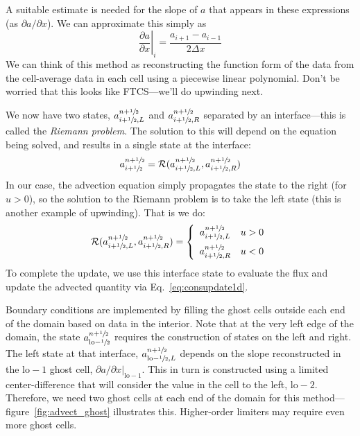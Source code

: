 A suitable estimate is needed for the slope of $a$ that appears in
these expressions (as $\partial a/\partial x$).  We can approximate
this simply as
\begin{equation}
\left . \frac{\partial a}{\partial x}\right |_i = \frac{a_{i+1} - a_{i-1}}{2 \Delta x} \label{eq:slopecentered}
\end{equation}
We can think of this method as reconstructing the function form of the
data from the cell-average data in each cell using a piecewise linear
polynomial.  Don't be worried that this looks like FTCS---we'll do
upwinding next.


We now have two states, $a_{i+\sfrac{1}{2},L}^{n+\sfrac{1}{2}}$ and
$a_{i+\sfrac{1}{2},R}^{n+\sfrac{1}{2}}$ separated by an interface---this is
called the {\em Riemann problem}.
%
The solution to this will depend on the equation being solved, and
results in a single state at the interface:
\begin{equation}
a_{i+\sfrac{1}{2}}^{n+\sfrac{1}{2}} = \mathcal{R}(a_{i+\sfrac{1}{2},L}^{n+\sfrac{1}{2}},a_{i+\sfrac{1}{2},R}^{n+\sfrac{1}{2}})
\end{equation}
In our case, the advection equation simply propagates the state to the
right (for $u > 0$), so the solution to the Riemann problem is to take
the left state (this is another example of upwinding).  That is we do:
\begin{equation}
\mathcal{R}(a_{i+\sfrac{1}{2},L}^{n+\sfrac{1}{2}},a_{i+\sfrac{1}{2},R}^{n+\sfrac{1}{2}}) = \left \{ \begin{array}{ccc} a_{i+\sfrac{1}{2},L}^{n+\sfrac{1}{2}} & u > 0 \\[2mm] a_{i+\sfrac{1}{2},R}^{n+\sfrac{1}{2}} & u < 0 \end{array} \right .
\label{eq:riemannsolve}
\end{equation}
To complete the update, we use this interface state to evaluate the flux
and update the advected quantity via Eq.~\ref{eq:consupdate1d}.

Boundary conditions are implemented by filling the ghost cells outside
each end of the domain based on data in the interior.  Note that at
the very left edge of the domain, the state
$a^{n+\sfrac{1}{2}}_{\mathrm{lo}-\sfrac{1}{2}}$ requires the construction of states on
the left and right.  The left state at that interface,
$a^{n+\sfrac{1}{2}}_{\mathrm{lo}-\sfrac{1}{2},L}$ depends on the slope reconstructed in
the $\mathrm{lo}-1$ ghost cell, $\partial a/\partial x
|_{\mathrm{lo}-1}$.  This in turn is constructed using a limited
center-difference that will consider the value in the cell to the
left, $\mathrm{lo-2}$.  Therefore, we need two ghost cells at each end
of the domain for this method---figure~\ref{fig:advect_ghost}
illustrates this.  Higher-order limiters may require even more ghost
cells.

